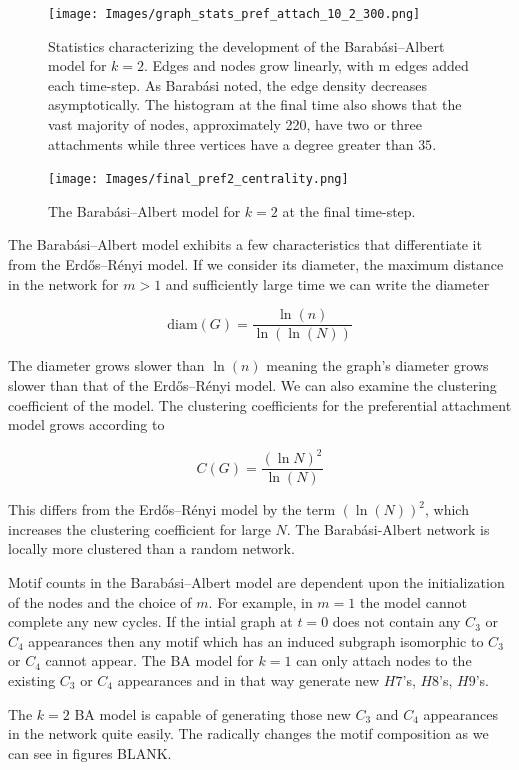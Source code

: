\begin{figure}[h!]
    \texttt{[image: Images/graph\_stats\_pref\_attach\_10\_2\_300.png]}
    \centering
    \caption{Statistics characterizing the development of the Barabási–Albert model for $k=2$.
    Edges and nodes grow linearly, with m edges added each time-step. As Barabási noted, the edge density decreases asymptotically. The histogram at
    the final time also shows that the vast majority of nodes, approximately 220, have two or three attachments
    while three vertices have a degree greater than $35$.}
\end{figure}

\begin{figure}
    \texttt{[image: Images/final\_pref2\_centrality.png]}
    \centering
    \caption{The Barabási–Albert model for $k=2$ at the final time-step.}
\end{figure}

The Barabási–Albert model exhibits a few characteristics that differentiate it from the 
Erdős–Rényi model. If we consider its diameter, the maximum distance in the network
for $m>1$ and sufficiently large time we can write the diameter 

$$\text{diam}(G) = \frac{\ln(n)}{\ln(\ln (N))}$$

The diameter grows slower than $\ln(n)$ meaning the graph's diameter grows slower than that of the 
Erdős–Rényi model. We can also examine the clustering coefficient of the model. 
The clustering coefficients for the preferential attachment model grows according to

$$
C(G) = \frac{(\ln N)^2}{\ln (N)}
$$

This differs from the Erdős–Rényi model by the term $(\ln (N))^2$,
which increases the clustering coefficient for large $N$.
The Barabási-Albert network is locally more clustered than a random network.

Motif counts in the Barabási–Albert model are dependent upon the initialization of the nodes 
and the choice of $m$. For example, in $m=1$ the model cannot complete any new cycles. If the
intial graph at $t=0$ does not contain any $C_3$ or $C_4$ appearances then any motif 
which has an induced subgraph isomorphic to $C_3$ or $C_4$ cannot appear. The BA model 
for $k=1$ can only attach nodes to the existing  $C_3$ or $C_4$ appearances and in that 
way generate new $H7$'s, $H8$'s, $H9$'s. 

The $k=2$ BA model is capable of generating those new $C_3$ and $C_4$ appearances in the network 
quite easily. The radically changes the motif composition as we can see in figures BLANK.


